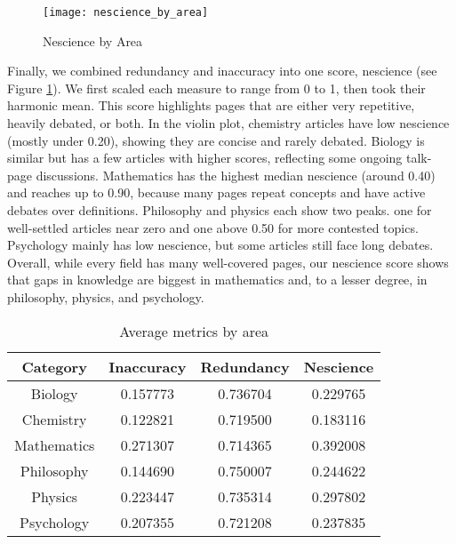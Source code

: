 \begin{figure}[h]
\centering\texttt{[image: nescience\_by\_area]}
\caption{\label{fig:nescience-by-area}Nescience by Area}
\end{figure}

Finally, we combined redundancy and inaccuracy into one score, nescience (see Figure \ref{fig:nescience-by-area}). We first scaled each measure to range from 0 to 1, then took their harmonic mean. This score highlights pages that are either very repetitive, heavily debated, or both. In the violin plot, chemistry articles have low nescience (mostly under 0.20), showing they are concise and rarely debated. Biology is similar but has a few articles with higher scores, reflecting some ongoing talk-page discussions. Mathematics has the highest median nescience (around 0.40) and reaches up to 0.90, because many pages repeat concepts and have active debates over definitions. Philosophy and physics each show two peaks. one for well-settled articles near zero and one above 0.50 for more contested topics. Psychology mainly has low nescience, but some articles still face long debates. Overall, while every field has many well-covered pages, our nescience score shows that gaps in knowledge are biggest in mathematics and, to a lesser degree, in philosophy, physics, and psychology.

\begin{table}
\begin{centering}
\begin{tabular}{|c|c|c|c|}
\hline 
Category & Inaccuracy & Redundancy & Nescience \tabularnewline
\hline 
\hline
Biology & 0.157773 & 0.736704 & 0.229765 \tabularnewline
\hline
Chemistry & 0.122821 & 0.719500 & 0.183116 \tabularnewline
\hline
Mathematics & 0.271307 & 0.714365 & 0.392008 \tabularnewline
\hline
Philosophy & 0.144690 & 0.750007 & 0.244622 \tabularnewline
\hline
Physics & 0.223447 & 0.735314 & 0.297802 \tabularnewline
\hline
Psychology & 0.207355 & 0.721208 & 0.237835 \tabularnewline
\hline
\end{tabular}
\par\end{centering}
\caption{\label{tab:average_metrics_by_area}Average metrics by area}
\end{table}

